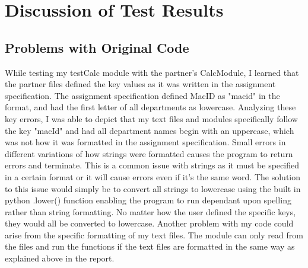 \documentclass[12pt]{article}
\begin{document}
\section{Discussion of Test Results}

\subsection{Problems with Original Code}
While testing my testCalc module with the partner's CalcModule, I learned that the partner files defined the key values as it was written in the 
assignment specification. The assignment specification defined MacID as "macid" in the format, and had the first letter of all departments as 
lowercase. Analyzing these key errors, I was able to depict that my text files and modules specifically follow the key "macId" and had all department 
names begin with an uppercase, which was not how it was formatted in the assignment specification. Small errors in different variations of how strings
were formatted causes the program to return errors and terminate. This is a common issue with strings as it must be specified in a certain format or it will
cause errors even if it's the same word. The solution to this issue would simply be to convert all strings to lowercase using the built in python .lower() function 
enabling the program to run dependant upon spelling rather than string formatting. No matter how the user defined the specific keys, 
they would all be converted to lowercase. Another problem with my code could arise from the specific formatting of my text files. The module can only 
read from the files and run the functions if the text files are formatted in the same way as explained above in the report.  
\end{document}
